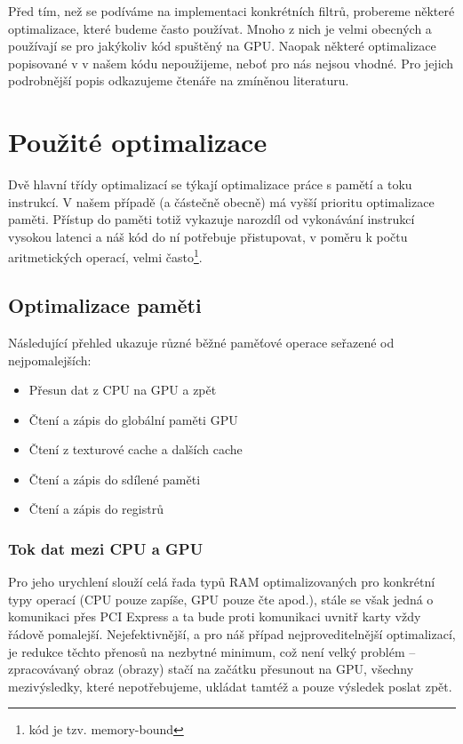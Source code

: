 
Před tím, než se podíváme na implementaci konkrétních filtrů, probereme některé optimalizace, které budeme často používat. Mnoho z nich je velmi obecných a používají se pro jakýkoliv kód spuštěný na GPU. Naopak některé optimalizace popisované v \cite{CUDA programming g.,CUDA best practices} v našem kódu nepoužijeme, neboť pro nás nejsou vhodné. Pro jejich podrobnější popis odkazujeme čtenáře na zmíněnou literaturu.

\section{Použité optimalizace}

    Dvě hlavní třídy optimalizací se týkají optimalizace práce s pamětí a toku instrukcí. V našem případě (a částečně obecně) má vyšší prioritu optimalizace paměti. Přístup do paměti totiž vykazuje narozdíl od vykonávání instrukcí vysokou latenci a náš kód do ní potřebuje přistupovat, v poměru k počtu aritmetických operací, velmi často\footnote{kód je tzv. memory-bound}.

    \subsection{Optimalizace paměti}

        Následující přehled ukazuje různé běžné paměťové operace seřazené od nejpomalejších:
    \begin{itemize}
      \item Přesun dat z CPU na GPU a zpět
      \item Čtení a zápis do globální paměti GPU
      \item Čtení z texturové cache a dalších cache
      \item Čtení a zápis do sdílené paměti
      \item Čtení a zápis do registrů
    \end{itemize}

        \subsubsection{Tok dat mezi CPU a GPU}

        Pro jeho urychlení slouží celá řada typů RAM optimalizovaných pro konkrétní typy operací (CPU pouze zapíše, GPU pouze čte apod.), stále se však jedná o komunikaci přes PCI Express a ta bude proti komunikaci uvnitř karty vždy řádově pomalejší. Nejefektivnější, a pro náš případ nejproveditelnější optimalizací, je redukce těchto přenosů na nezbytné minimum, což není velký problém -- zpracovávaný obraz (obrazy) stačí na začátku přesunout na GPU, všechny mezivýsledky, které nepotřebujeme, ukládat tamtéž a pouze výsledek poslat zpět.

